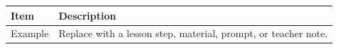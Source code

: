 \begin{TPTWideTable}
\caption{Example TPT classroom-ready table.}
\label{tab:example}
\centering
\begin{tabular}{ll}
\toprule
Item & Description \\
\midrule
Example & Replace with a lesson step, material, prompt, or teacher note. \\
\bottomrule
\end{tabular}
\end{TPTWideTable}
